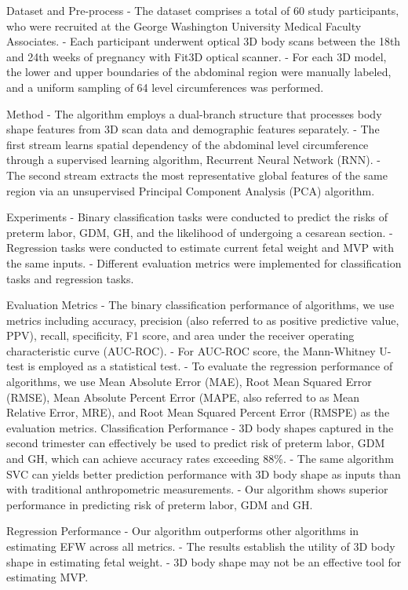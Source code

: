 \documentclass[conference, 12pt]{IEEEtran}
\begin{document}
Dataset and Pre-process
- The dataset comprises a total of 60 study participants, who were recruited at the George Washington University Medical Faculty Associates.
- Each participant underwent optical 3D body scans between the 18th and 24th weeks of pregnancy with Fit3D optical scanner.
- For each 3D model, the lower and upper boundaries of the abdominal region were manually labeled, and a uniform sampling of 64 level circumferences was performed.

Method
- The algorithm employs a dual-branch structure that processes body shape features from 3D scan data and demographic features separately.
- The first stream learns spatial dependency of the abdominal level circumference through a supervised learning algorithm, Recurrent Neural Network (RNN).
- The second stream extracts the most representative global features of the same region via an unsupervised Principal Component Analysis (PCA) algorithm.

Experiments
- Binary classification tasks were conducted to predict the risks of preterm labor, GDM, GH, and the likelihood of undergoing a cesarean section.
- Regression tasks were conducted to estimate current fetal weight and MVP with the same inputs.
- Different evaluation metrics were implemented for classification tasks and regression tasks.

Evaluation Metrics
- The binary classification performance of algorithms, we use metrics including accuracy, precision (also referred to as positive predictive value, PPV), recall, specificity, F1 score, and area under the receiver operating characteristic curve (AUC-ROC).
- For AUC-ROC score, the Mann-Whitney U-test is employed as a statistical test.
- To evaluate the regression performance of algorithms, we use Mean Absolute Error (MAE), Root Mean Squared Error (RMSE), Mean Absolute Percent Error (MAPE, also referred to as Mean Relative Error, MRE), and Root Mean Squared Percent Error (RMSPE) as the evaluation metrics.
Classification Performance
- 3D body shapes captured in the second trimester can effectively be used to predict risk of preterm labor, GDM and GH, which can achieve accuracy rates exceeding 88\%.
- The same algorithm SVC can yields better prediction performance with 3D body shape as inputs than with traditional anthropometric measurements.
- Our algorithm shows superior performance in predicting risk of preterm labor, GDM and GH.

Regression Performance
- Our algorithm outperforms other algorithms in estimating EFW across all metrics.
- The results establish the utility of 3D body shape in estimating fetal weight.
- 3D body shape may not be an effective tool for estimating MVP.
\end{document}
